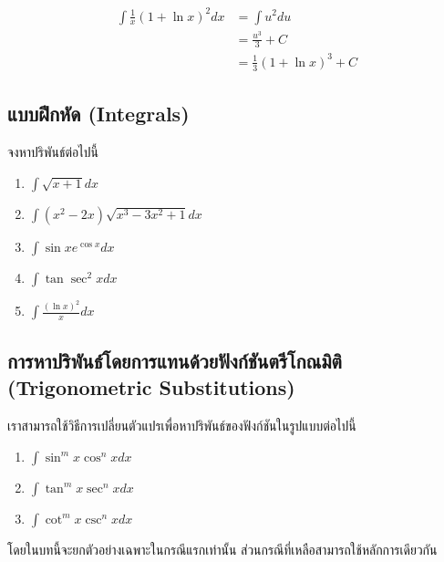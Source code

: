 \documentclass[
]{book}
\theoremstyle{definition}
\theoremstyle{definition}
\theoremstyle{definition}
\theoremstyle{definition}
\theoremstyle{remark}
\begin{document}
\begin{equation}
\begin{aligned}
        \int \frac{1}{x} (1+ \ln x)^2 dx  &= \int u^2 du \\
                                &= \frac{u^3}{3} + C\\
                                &= \frac{1}{3} (1 + \ln x)^3 + C
\end{aligned}
\end{equation}

\subsection{แบบฝึกหัด (Integrals)}\label{uxe41uxe1auxe1auxe1duxe01uxe2buxe14-integrals}

จงหาปริพันธ์ต่อไปนี้

\begin{enumerate}
\def\labelenumi{\arabic{enumi}.}
\item
  \(\int \sqrt{x+1} dx\)
\item
  \(\int (x^2 - 2x) \sqrt{x^3 - 3x^2 +1} dx\)
\item
  \(\int \sin x e^{\cos x} dx\)
\item
  \(\int \tan \sec^2 x dx\)
\item
  \(\int \frac{(\ln x)^2}{x} dx\)
\end{enumerate}

\subsection{การหาปริพันธ์โดยการแทนด้วยฟังก์ชันตรีโกณมิติ (Trigonometric Substitutions)}\label{uxe01uxe32uxe23uxe2buxe32uxe1buxe23uxe1euxe19uxe18uxe42uxe14uxe22uxe01uxe32uxe23uxe41uxe17uxe19uxe14uxe27uxe22uxe1fuxe07uxe01uxe0auxe19uxe15uxe23uxe42uxe01uxe13uxe21uxe15-trigonometric-substitutions}

เราสามารถใช้วิธีการเปลี่ยนตัวแปรเพื่อหาปริพันธ์ของฟังก์ชันในรูปแบบต่อไปนี้

\begin{enumerate}
\def\labelenumi{\arabic{enumi}.}
\item
  \(\int \sin^m x \cos^n x dx\)
\item
  \(\int \tan^m x \sec^n x dx\)
\item
  \(\int \cot^m x \csc^n x dx\)
\end{enumerate}

โดยในบทนี้จะยกตัวอย่างเฉพาะในกรณีแรกเท่านั้น ส่วนกรณีที่เหลือสามารถใช้หลักการเดียวกัน
\end{document}
